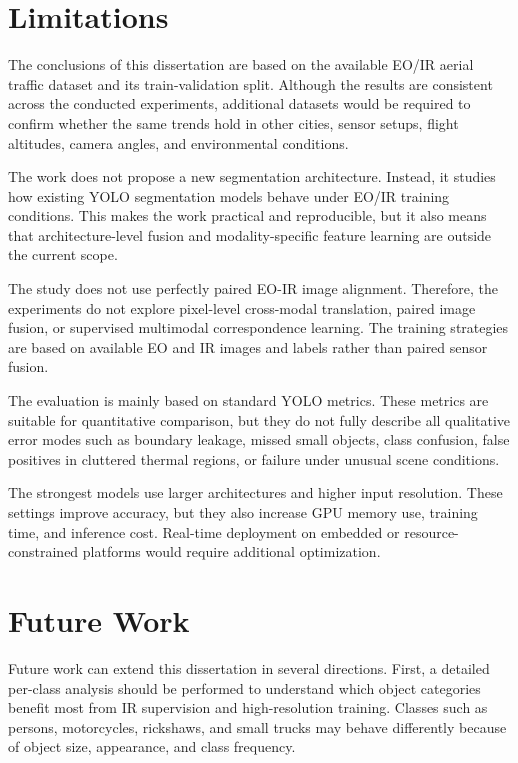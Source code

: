 \section{Limitations}

The conclusions of this dissertation are based on the available EO/IR aerial traffic dataset and its train-validation split. Although the results are consistent across the conducted experiments, additional datasets would be required to confirm whether the same trends hold in other cities, sensor setups, flight altitudes, camera angles, and environmental conditions.

The work does not propose a new segmentation architecture. Instead, it studies how existing YOLO segmentation models behave under EO/IR training conditions. This makes the work practical and reproducible, but it also means that architecture-level fusion and modality-specific feature learning are outside the current scope.

The study does not use perfectly paired EO-IR image alignment. Therefore, the experiments do not explore pixel-level cross-modal translation, paired image fusion, or supervised multimodal correspondence learning. The training strategies are based on available EO and IR images and labels rather than paired sensor fusion.

The evaluation is mainly based on standard YOLO metrics. These metrics are suitable for quantitative comparison, but they do not fully describe all qualitative error modes such as boundary leakage, missed small objects, class confusion, false positives in cluttered thermal regions, or failure under unusual scene conditions.

The strongest models use larger architectures and higher input resolution. These settings improve accuracy, but they also increase GPU memory use, training time, and inference cost. Real-time deployment on embedded or resource-constrained platforms would require additional optimization.

\section{Future Work}

Future work can extend this dissertation in several directions. First, a detailed per-class analysis should be performed to understand which object categories benefit most from IR supervision and high-resolution training. Classes such as persons, motorcycles, rickshaws, and small trucks may behave differently because of object size, appearance, and class frequency.

